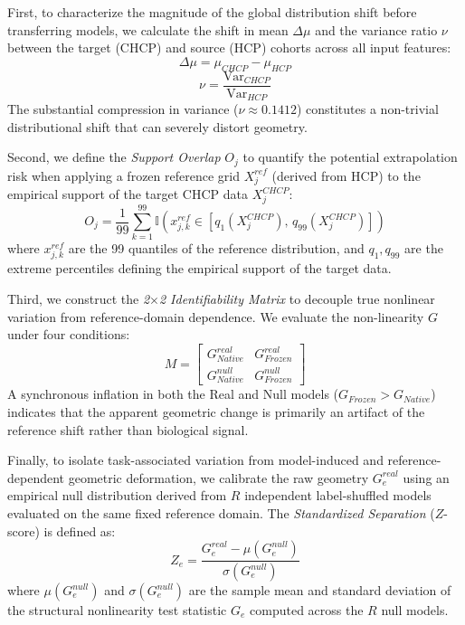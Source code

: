 \documentclass{article}
\begin{document}
First, to characterize the magnitude of the global distribution shift before transferring models, we calculate the shift in mean $\Delta\mu$ and the variance ratio $\nu$ between the target (CHCP) and source (HCP) cohorts across all input features:
\begin{equation}
\Delta\mu = \mu_{CHCP} - \mu_{HCP}
\end{equation}
\begin{equation}
\nu = \frac{\mathrm{Var}_{CHCP}}{\mathrm{Var}_{HCP}}
\end{equation}
The substantial compression in variance ($\nu \approx 0.1412$) constitutes a non-trivial distributional shift that can severely distort geometry.

Second, we define the \textit{Support Overlap} $O_j$ to quantify the potential extrapolation risk when applying a frozen reference grid $X_j^{ref}$ (derived from HCP) to the empirical support of the target CHCP data $X_j^{CHCP}$:
\begin{equation}
O_j = \frac{1}{99} \sum_{k=1}^{99} \mathbb{I}\left( x_{j,k}^{ref} \in [q_{1}(X_j^{CHCP}), \, q_{99}(X_j^{CHCP})] \right)
\end{equation}
where $x_{j,k}^{ref}$ are the 99 quantiles of the reference distribution, and $q_{1}, q_{99}$ are the extreme percentiles defining the empirical support of the target data.

Third, we construct the \textit{2$\times$2 Identifiability Matrix} to decouple true nonlinear variation from reference-domain dependence. We evaluate the non-linearity $G$ under four conditions:
\begin{equation}
M = \begin{bmatrix}
G^{real}_{Native} & G^{real}_{Frozen} \\
G^{null}_{Native} & G^{null}_{Frozen}
\end{bmatrix}
\end{equation}
A synchronous inflation in both the Real and Null models ($G_{Frozen} > G_{Native}$) indicates that the apparent geometric change is primarily an artifact of the reference shift rather than biological signal.

Finally, to isolate task-associated variation from model-induced and reference-dependent geometric deformation, we calibrate the raw geometry $G_e^{real}$ using an empirical null distribution derived from $R$ independent label-shuffled models evaluated on the same fixed reference domain. The \textit{Standardized Separation} ($Z$-score) is defined as:
\begin{equation}
Z_e = \frac{G_e^{real} - \mu(G_e^{null})}{\sigma(G_e^{null})}
\end{equation}
where $\mu(G_e^{null})$ and $\sigma(G_e^{null})$ are the sample mean and standard deviation of the structural nonlinearity test statistic $G_e$ computed across the $R$ null models.
\end{document}
